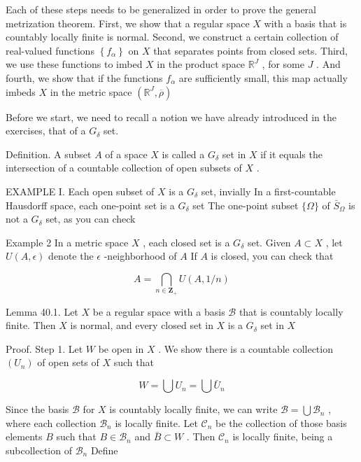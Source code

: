 \documentclass[10pt]{article}
\begin{document}
Each of these steps needs to be generalized in order to prove the general metrization theorem. First, we show that a regular space \(X\) with a basis that is countably locally finite is normal. Second, we construct a certain collection of real-valued functions \(\left\{  {f}_{\alpha }\right\}\) on \(X\) that separates points from closed sets. Third, we use these functions to imbed \(X\) in the product space \({\mathbb{R}}^{J}\) , for some \(J\) . And fourth, we show that if the functions \({f}_{\alpha }\) are sufficiently small, this map actually imbeds \(X\) in the metric space \(\left( {{\mathbb{R}}^{J},\overline{\rho }}\right)\)

Before we start, we need to recall a notion we have already introduced in the exercises, that of a \({G}_{\delta }\) set.

Definition. A subset \(A\) of a space \(X\) is called a \({G}_{\delta }\) set in \(X\) if it equals the intersection of a countable collection of open subsets of \(X\) .

EXAMPLE I. Each open subset of \(X\) is a \({G}_{\delta }\) set, invially In a first-countable Hausdorff space, each one-point set is a \({G}_{\delta }\) set The one-point subset \(\{ \Omega \}\) of \({\bar{S}}_{\Omega }\) is not a \({G}_{\delta }\) set, as you can check

Example 2 In a metric space \(X\) , each closed set is a \({G}_{\delta }\) set. Given \(A \subset  X\) , let \(U\left( {A,\epsilon }\right)\) denote the \(\epsilon\) -neighborhood of \(A\) If \(A\) is closed, you can check that

\[
A = \mathop{\bigcap }\limits_{{n \in  {\mathbf{Z}}_{ + }}}U\left( {A,1/n}\right)
\]

Lemma 40.1. Let \(X\) be a regular space with a basis \(\mathcal{B}\) that is countably locally finite. Then \(X\) is normal, and every closed set in \(X\) is a \({G}_{\delta }\) set in \(X\)

Proof. Step 1. Let \(W\) be open in \(X\) . We show there is a countable collection \(\left( {U}_{n}\right)\) of open sets of \(X\) such that

\[
W = \bigcup {U}_{n} = \bigcup {\bar{U}}_{n}
\]

Since the basis \(\mathcal{B}\) for \(X\) is countably locally finite, we can write \(\mathcal{B} = \bigcup {\mathcal{B}}_{n}\) , where each collection \({\mathcal{B}}_{n}\) is locally finite. Let \({\mathcal{C}}_{n}\) be the collection of those basis elements \(B\) such that \(B \in  {\mathcal{B}}_{n}\) and \(\bar{B} \subset  W\) . Then \({\mathcal{C}}_{n}\) is locally finite, being a subcollection of \({\mathcal{B}}_{n}\) Define
\end{document}

